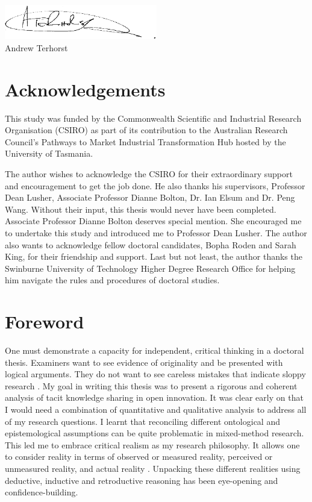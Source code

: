 \documentclass[12pt,table]{book}
\renewcommand{\today}{\the\day \ \monthname \ \the\year}
\begin{document}
\includegraphics[width = 0.5\textwidth]{Images/Signature.png}\\
Andrew Terhorst\\
\shortdate{\today}

\chapter*{Acknowledgements}

This study was funded by the Commonwealth Scientific and Industrial Research Organisation (CSIRO) as part of its contribution to the Australian Research Council's Pathways to Market Industrial Transformation Hub hosted by the University of Tasmania. \medskip

\noindent
The author wishes to acknowledge the CSIRO for their extraordinary support and encouragement to get the job done. He also thanks his supervisors, Professor Dean Lusher, Associate Professor Dianne Bolton, Dr. Ian Elsum and Dr. Peng Wang. Without their input, this thesis would never have been completed. Associate Professor Dianne Bolton deserves special mention. She encouraged me to undertake this study and introduced me to Professor Dean Lusher. The author also wants to acknowledge fellow doctoral candidates, Bopha Roden and Sarah King, for their friendship and support. Last but not least, the author thanks the Swinburne University of Technology Higher Degree Research Office for helping him navigate the rules and procedures of doctoral studies. \medskip

\chapter*{Foreword}

One must demonstrate a capacity for independent, critical thinking in a doctoral thesis. Examiners want to see evidence of originality and be presented with logical arguments. They do not want to see careless mistakes that indicate sloppy research \citep{mullins2002its}. My goal in writing this thesis was to present a rigorous and coherent analysis of tacit knowledge sharing in open innovation. It was clear early on that I would need a combination of quantitative and qualitative analysis to address all of my research questions. I learnt that reconciling different ontological and epistemological assumptions can be quite problematic in mixed-method research. This led me to embrace critical realism as my research philosophy. It allows one to consider reality in terms of observed or  measured reality, perceived or unmeasured reality, and actual reality \citep{bhaskar2013realist}. Unpacking these different realities using deductive, inductive and retroductive reasoning has been eye-opening and confidence-building. \medskip
\end{document}

